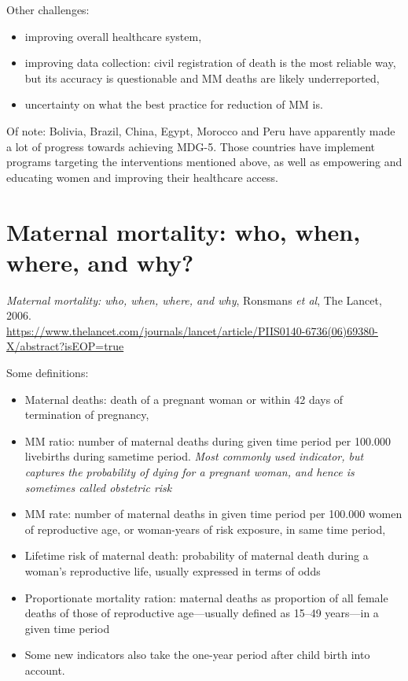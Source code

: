 \documentclass[a4paper,12pt]{article}
\begin{document}
Other challenges:
\begin{itemize}
\item improving overall healthcare system,
\item improving data collection: civil registration of death is the most reliable way, but its accuracy is questionable and MM deaths are likely underreported,
\item uncertainty on what the best practice for reduction of MM is.
\end{itemize}

Of note: Bolivia, Brazil, China, Egypt, Morocco and Peru have apparently made a lot of progress towards achieving MDG-5. Those countries have implement programs targeting the interventions mentioned above, as well as empowering and educating women and improving their healthcare access.


\section{Maternal mortality: who, when, where, and why?}

\textit{Maternal mortality: who, when, where, and why}, Ronsmans \textit{et al}, The Lancet, 2006.\\
\url{https://www.thelancet.com/journals/lancet/article/PIIS0140-6736(06)69380-X/abstract?isEOP=true}

Some definitions:
\begin{itemize}
\item Maternal deaths: death of a pregnant woman or within 42 days of termination of pregnancy,
\item MM ratio: number of maternal deaths during given time period per 100.000 livebirths during sametime period. \textit{Most commonly used indicator, but captures the probability of dying for a pregnant woman, and hence is sometimes called obstetric risk}
\item MM rate: number of maternal deaths in given time period per 100.000 women of reproductive age, or woman-years of risk exposure, in same time period,
\item Lifetime risk of maternal death: probability of maternal death during a woman’s reproductive life, usually expressed in terms of odds
\item Proportionate mortality ration: maternal deaths as proportion of all female deaths of those of reproductive age—usually deﬁned as 15–49 years—in a given time period
\item Some new indicators also take the one-year period after child birth into account.
\end{itemize}
\end{document}
